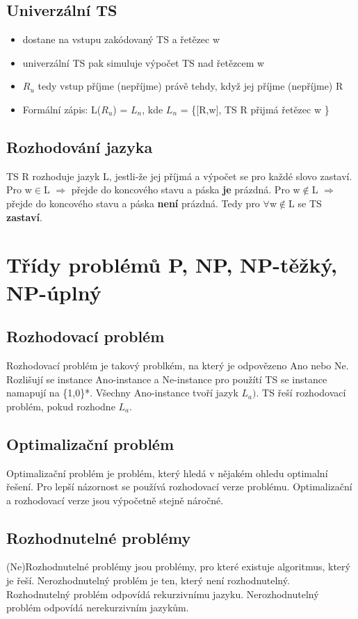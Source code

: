\documentclass{../../szzclass}
\begin{document}
\subsection{Univerzální TS}
\begin{itemize}
    \item dostane na vstupu zakódovaný TS a řetězec w
    \item univerzální TS pak simuluje výpočet TS nad řetězcem w
    \item $R_u$ tedy vstup příjme (nepříjme) právě tehdy, když jej příjme (nepříjme) R
    \item Formální zápis: L($R_u$) = $L_n$, kde $L_n$ = \{[R,w], TS R přijmá řetězec w \}
\end{itemize}
\subsection{Rozhodování jazyka}
TS R rozhoduje jazyk L, jestli-že jej příjmá a výpočet se pro každé slovo zastaví.
\newline
Pro w$\in$L $\Rightarrow$ přejde do koncového stavu a páska \textbf{je} prázdná.
\newline
Pro w$\notin$L $\Rightarrow$ přejde do koncového stavu a páska \textbf{není} prázdná.
\newline
Tedy pro $\forall$w$\notin$L se TS \textbf{zastaví}. 


\section{Třídy problémů P, NP, NP-těžký, NP-úplný}
\subsection{Rozhodovací problém}
Rozhodovací problém je takový problkém, na který je odpovězeno Ano nebo Ne. Rozlišují se instance Ano-instance a Ne-instance
pro použítí TS se instance namapují na \{1,0\}*. Všechny Ano-instance tvoří jazyk $L_a)$. TS řeší rozhodovací problém, pokud rozhodne $L_a$.
\subsection{Optimalizační problém}
Optimalizační problém je problém, který hledá v nějakém ohledu optimalní řešení. Pro lepší názornost se používá rozhodovací verze problému.
Optimalizační a rozhodovací verze jsou výpočetně stejně náročné.
\subsection{Rozhodnutelné problémy}
(Ne)Rozhodnutelné problémy jsou problémy, pro které existuje algoritmus, který je řeší. Nerozhodnutelný problém je ten, který není rozhodnutelný.
\newline
Rozhodnutelný problém odpovídá rekurzivnímu jazyku.
\newline
Nerozhodnutelný problém odpovídá nerekurzivním jazykům.
\end{document}
